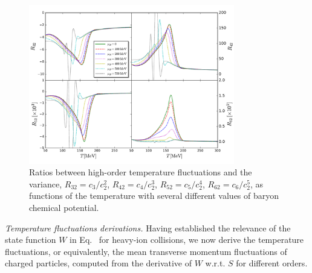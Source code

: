 \documentclass[aps,twocolumn,
prl,
superscriptaddress,nofootinbib,floatfix]{revtex4-2}
\begin{document}
%
\begin{figure}[t]
\includegraphics[width=0.8\textwidth]{Rmn}
\caption{Ratios between high-order temperature fluctuations and the variance, $R_{32}=c_3/c_2^2$, $R_{42}=c_4/c_2^3$, $R_{52}=c_5/c_2^4$, $R_{62}=c_6/c_2^5$, as functions of the temperature with several different values of baryon chemical potential.}
\label{fig:Rmn}
\end{figure}
%



\textit{Temperature fluctuations derivations.} \label{sec:tem-fluc}  
Having established the relevance of the state function $W$ in Eq.~ for heavy-ion collisions, we now derive the temperature fluctuations, or equivalently, the mean transverse momentum fluctuations of charged particles, computed from the derivative of $W$ w.r.t. $S$ for different orders.
\end{document}
